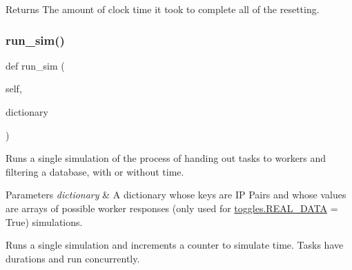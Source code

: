 \begin{DoxyReturn}{Returns}
The amount of clock time it took to complete all of the resetting. 
\end{DoxyReturn}
\mbox{\label{classdynamicfilterapp_1_1test__simulations_1_1_simulation_test_a7c1fa7ae63b7dde48b4c91c2eeda3b75}} 
\subsubsection{\texorpdfstring{run\+\_\+sim()}{run\_sim()}}
{\footnotesize\ttfamily def run\+\_\+sim (\begin{DoxyParamCaption}\item[{}]{self,  }\item[{}]{dictionary }\end{DoxyParamCaption})}



Runs a single simulation of the process of handing out tasks to workers and filtering a database, with or without time. 


\begin{DoxyParams}{Parameters}
{\em dictionary} & A dictionary whose keys are IP Pairs and whose values are arrays of possible worker responses (only used for \mbox{\hyperlink{namespacedynamicfilterapp_1_1toggles_a00674fe8ef8f59b37d7fe239813bb627}{toggles.\+R\+E\+A\+L\+\_\+\+D\+A\+TA}} = True) simulations. \begin{DoxyVerb}Runs a single simulation and increments a counter to simulate time. Tasks
have durations and run concurrently.
\end{DoxyVerb}
 \\
\hline
\end{DoxyParams}
\mbox{\label{classdynamicfilterapp_1_1test__simulations_1_1_simulation_test_afa1a5372de5dde3c9948a073e6320e38}} 
